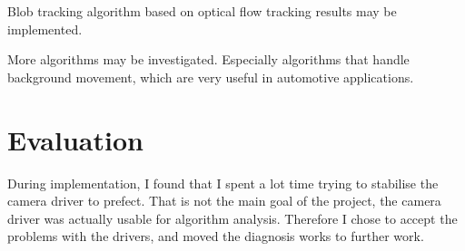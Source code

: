 Blob tracking algorithm based on optical flow tracking results may be implemented.

More algorithms may be investigated. Especially algorithms that handle background movement, which are very useful in automotive applications.

\section{Evaluation}

During implementation, I found that I spent a lot time trying to stabilise the camera driver to prefect. That is not the main goal of the project, the camera driver was actually usable for algorithm analysis. Therefore I chose to accept the problems with the drivers, and moved the diagnosis works to further work.

